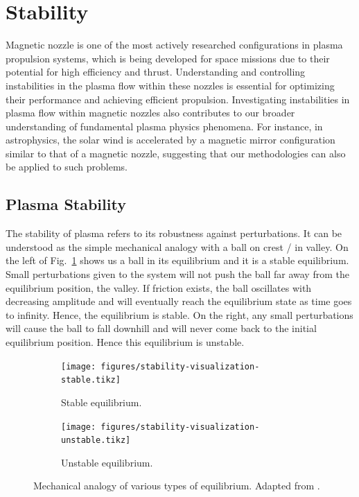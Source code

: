 \section{Stability} \label{sec:instability-of-plasma-flow}
Magnetic nozzle is one of the most actively researched configurations in plasma propulsion systems, which is being developed for space missions due to their potential for high efficiency and thrust. Understanding and controlling instabilities in the plasma flow within these nozzles is essential for optimizing their performance and achieving efficient propulsion. Investigating instabilities in plasma flow within magnetic nozzles also contributes to our broader understanding of fundamental plasma physics phenomena. For instance, in astrophysics, the solar wind is accelerated by a magnetic mirror configuration similar to that of a magnetic nozzle, suggesting that our methodologies can also be applied to such problems.

\subsection{Plasma Stability}
The stability of plasma refers to its robustness against perturbations. It can be understood as the simple mechanical analogy with a ball on crest / in valley. On the left of Fig.~\ref{fig:stability-visualization} shows us a ball in its equilibrium and it is a stable equilibrium. Small perturbations given to the system will not push the ball far away from the equilibrium position, the valley. If friction exists, the ball oscillates with decreasing amplitude and will eventually reach the equilibrium state as time goes to infinity. Hence, the equilibrium is stable. On the right, any small perturbations will cause the ball to fall downhill and will never come back to the initial equilibrium position. Hence this equilibrium is unstable.

\begin{figure}[htbp]
	\centering
	\begin{subfigure}[b]{0.5\textwidth}
		\centering
		\texttt{[image: figures/stability-visualization-stable.tikz]}
		\caption{Stable equilibrium.}
	\end{subfigure}%
	\begin{subfigure}[b]{0.5\textwidth}
		\centering
		\texttt{[image: figures/stability-visualization-unstable.tikz]}
		\caption{Unstable equilibrium.}
	\end{subfigure}
	\caption{Mechanical analogy of various types of equilibrium. Adapted from \cite{chen_introduction_2016}.}
	\label{fig:stability-visualization}
\end{figure}


